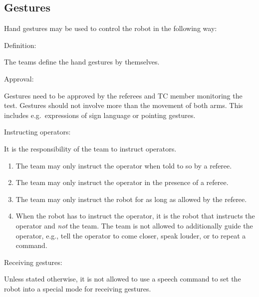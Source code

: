 \subsection{Gestures}\label{rule:gestures}
Hand gestures may be used to control the robot in the following way:
\begin{enumerate}
{\bf\item Definition:} The teams define the hand gestures by themselves. 
{\bf\item Approval:} Gestures need to be approved by the referees and TC member monitoring the test.
Gestures should not involve more than the movement of both arms. 
This includes e.g.~expressions of sign language or pointing gestures.
{\bf\item Instructing operators:} It is the responsibility of the team to instruct operators.
\begin{enumerate}
\item The team may only instruct the operator when told to so by a referee.
\item The team may only instruct the operator in the presence of a referee.
\item The team may only instruct the robot for as long as allowed by the referee.
\item When the robot has to instruct the operator, it is the robot that instructs the operator and \emph{not} the team.
The team is not allowed to additionally guide the operator, e.g., tell the operator to come closer, speak louder, or to repeat a command.
\end{enumerate}
{\bf\item Receiving gestures:} Unless stated otherwise, it is not allowed to use 
a speech command to set the robot into a special mode for receiving gestures.
\end{enumerate}



